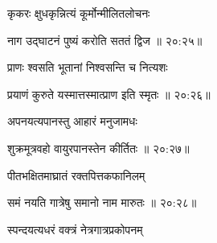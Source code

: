 {\devanagarifont कृकरः क्षुधकृन्नित्यं कूर्मोन्मीलितलोचनः \thinspace{\dandab} \dontdisplaylinenum }%


{\devanagarifont नाग उद्घाटनं पुष्यं करोति सततं द्विज {॥ २०:२५॥} \veg\dontdisplaylinenum }%

{\devanagarifont प्राणः श्वसति भूतानां निश्वसन्ति च नित्यशः \thinspace{\dandab} \dontdisplaylinenum }%


{\devanagarifont प्रयाणं कुरुते यस्मात्तस्मात्प्राण इति स्मृतः {॥ २०:२६॥} \veg\dontdisplaylinenum }%

{\devanagarifont अपनयत्यपानस्तु आहारं मनुजामधः \thinspace{\dandab} \dontdisplaylinenum }%


{\devanagarifont शुक्रमूत्रवहो वायुरपानस्तेन कीर्तितः {॥ २०:२७॥} \veg\dontdisplaylinenum }%

{\devanagarifont पीतभक्षितमाघ्रातं रक्तपित्तकफानिलम् \thinspace{\dandab} \dontdisplaylinenum }%


{\devanagarifont समं नयति गात्रेषु समानो नाम मारुतः {॥ २०:२८॥} \veg\dontdisplaylinenum }%
 
{\devanagarifont स्पन्दयत्यधरं वक्त्रं नेत्रगात्रप्रकोपनम् \thinspace{\dandab} \dontdisplaylinenum }%

